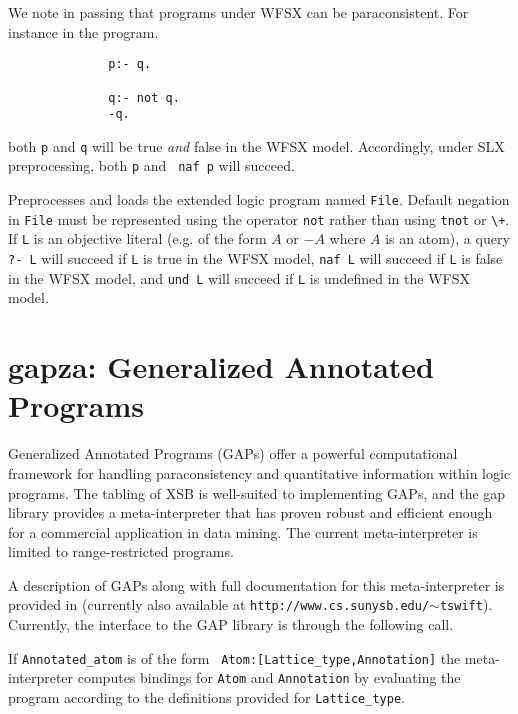 We note in passing that programs under WFSX can be paraconsistent.
For instance in the program.

\begin{verbatim}
              p:- q.

              q:- not q.
              -q.
\end{verbatim}

both {\tt p} and {\tt q} will be true {\em and} false in the WFSX
model.  Accordingly, under SLX preprocessing, both {\tt p} and {\tt
naf p} will succeed.

\begin{description}
Preprocesses and loads the extended logic program named {\tt File}.
Default negation in {\tt File} must be represented using the operator
{\tt not} rather than using {\tt tnot} or \verb|\+|.  If {\tt L} is an
objective literal (e.g. of the form $A$ or $-A$ where $A$ is an atom),
a query {\tt ?- L} will succeed if {\tt L} is true in the WFSX model,
{\tt naf L} will succeed if {\tt L} is false in the WFSX model, and
{\tt und L} will succeed if {\tt L} is undefined in the WFSX model.
\end{description}


\section{gapza: Generalized Annotated Programs}
\label{library_utilities:gap} 

Generalized Annotated Programs (GAPs) \cite{KiSu92} offer a powerful
computational framework for handling paraconsistency and quantitative
information within logic programs.  The tabling of XSB is well-suited
to implementing GAPs, and the gap library provides a meta-interpreter
that has proven robust and efficient enough for a commercial
application in data mining.  The current meta-interpreter is limited
to range-restricted programs.

A description of GAPs along with full documentation for this
meta-interpreter is provided in \cite{Swif99a} (currently also
available at {\tt http://www.cs.sunysb.edu/$\sim$tswift}).  Currently, the
interface to the GAP library is through the following call.

\begin{description}
%
If {\tt Annotated\_atom} is of the form {\tt
Atom:[Lattice\_type,Annotation]} the meta-interpreter computes bindings
for {\tt Atom} and {\tt Annotation} by evaluating the program
according to the definitions provided for {\tt Lattice\_type}.
\end{description}



